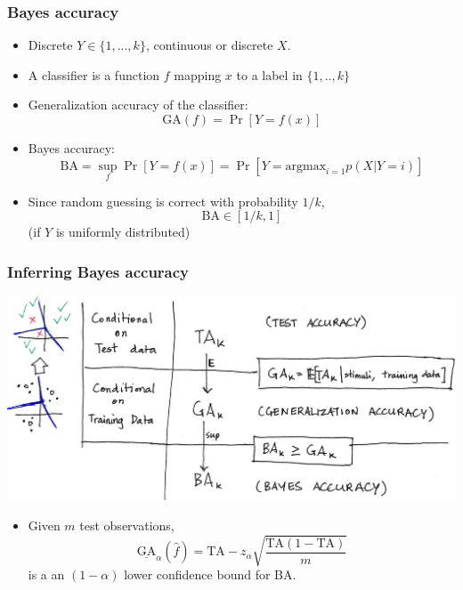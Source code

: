 \documentclass{beamer}
\begin{document}
\begin{frame}
\frametitle{Bayes accuracy}
\begin{itemize}
\item Discrete $Y \in \{1,...,k\}$, continuous or discrete $X$.
\item A classifier is a function $f$ mapping $x$ to a label in $\{1,..,k\}$ \pause
\item Generalization accuracy of the classifier:
\[
\text{GA}(f) = \Pr[Y = f(x)]
\]
\pause
\item Bayes accuracy:
\[
\text{BA} = \sup_f \Pr[Y = f(x)] = \Pr[Y = \text{argmax}_{i=1} p(X|Y=i)]
\]
\pause
\item Since random guessing is correct with probability $1/k$,
\[
\text{BA} \in [1/k, 1]
\]
(if $Y$ is uniformly distributed)
\end{itemize}
\end{frame}

\begin{frame}
\frametitle{Inferring Bayes accuracy}
\begin{center}
\includegraphics[scale = 0.3]{ta_to_ba.png}
\end{center}
\begin{itemize}
\item Given $m$ test observations,
\[
\underline{\text{GA}}_\alpha(\hat{f}) = \text{TA} - z_\alpha\sqrt{\frac{\text{TA}(1-\text{TA})}{m}}
\]
is a an $(1-\alpha)$ lower confidence bound for $\text{BA}$.
\end{itemize}
\end{frame}
\end{document}
